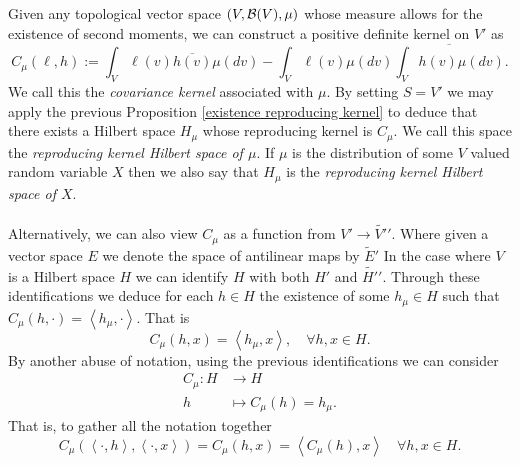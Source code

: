 \documentclass[12pt]{article}
\newcommand{\br}[1]{\left\langle#1\right\rangle}
\begin{document}
Given any topological vector space $(V,\mathcal{B}(V),\mu )$ whose measure allows for the existence of second moments, we can construct a positive definite kernel on $V'$ as
\begin{equation*}
	C_\mu (\ell ,h):=\int_{V}\ell (v) \overline{h(v)}\mu (dv)-\int_{V}\ell (v) \mu (dv)\overline{\int_{V}h(v)\mu (dv)}.
\end{equation*}
We call this the \emph{covariance kernel} associated with $\mu $. By setting $S=V'$ we may apply the previous Proposition \ref{existence reproducing kernel}
to deduce that there exists a Hilbert space $H_\mu $ whose reproducing kernel is $C_\mu $. We call this space the \emph{reproducing kernel Hilbert space of $\mu $}. If $\mu $ is the distribution of some $V$ valued random variable $X$ then we also say that $H_\mu $ is the  \emph{reproducing kernel Hilbert space of $X$}.\\
\\
Alternatively, we can also view  $C_\mu $ as a function from $V'\to \tilde{V'}'$. Where given a vector space $E$ we denote the space of antilinear maps by   $\tilde{E}'$ In the case where $V$ is a Hilbert space $H$ we can identify $H$ with both $H'$ and $\tilde{H'}'$. Through these identifications we deduce for each $h\in H$ the existence of  some $h_\mu \in H$ such that
$C_\mu (h,\cdot )=\br{h_\mu,\cdot  }$. That is
\begin{equation*}
	C_\mu (h,x)=\br{h_\mu,x},\quad\forall h,x \in H .
\end{equation*}
By another abuse of notation, using the previous identifications we can consider
\begin{align*}
	C_\mu : H & \longrightarrow H             \\
	h         & \longmapsto C_\mu (h) = h_\mu
	.\end{align*}
That is, to gather all the notation together
\begin{equation*}
	C_\mu (\br{\cdot ,h},\br{\cdot ,x})=C_\mu (h,x)=\br{C_\mu (h),x}\quad\forall h,x\in H.
\end{equation*}
\end{document}
